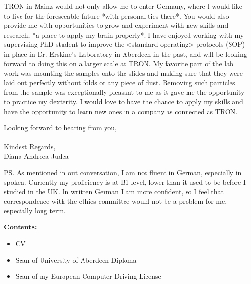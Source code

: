 \documentclass[paper=a4,fontsize=11pt]{scrartcl} %
\newcommand{\sepspace}{\vspace*{1em}}		%
\begin{document}
  \noindent 
  TRON in Mainz would not only allow me to enter Germany, where I would like to
  live for the foreseeable future *with personal ties there*.  You would also
  provide me with opportunities to grow and experiment with new skills and
  research, *a place to apply my brain properly*.  I have enjoyed working with
  my supervising PhD student to improve the <standard operating> protocols
  (SOP) in place in Dr. Erskine's Laboratory in Aberdeen in the past, and will
  be looking forward to doing this on a larger scale at TRON.  My favorite part
  of the lab work was mounting the samples onto the slides and making sure that
  they were laid out perfectly without folds or any piece of dust.  Removing
  such particles from the sample was exceptionally pleasant to me as it gave me
  the opportunity to practice my dexterity.  I would love to have the chance to
  apply my skills and have the opportunity to learn new ones in a company as
  connected as TRON.
  \sepspace


  \noindent
  Looking forward to hearing from you, \\\\
  Kindest Regards,\\
  Diana Andreea Judea
  \sepspace

  \noindent
  PS. As mentioned in out conversation, I am not fluent in German, especially
  in spoken.  Currently my proficiency is at B1 level, lower than it used to be
  before I studied in the UK.  In written German I am more confident, so I feel
  that correspondence with the ethics committee would not be a problem for me,
  especially long term.
  \sepspace

  \vspace*{\fill}
  
  \textbf{\underline{Contents:}}
  \begin{itemize}[noitemsep,topsep=0pt]
    \setlength\itemsep{1pt}
    \item CV
    \item Scan of University of Aberdeen Diploma
    \item Scan of my European Computer Driving License
  \end{itemize}
  
  \cleardoublepage
  
\end{document}
